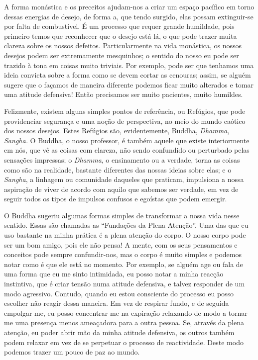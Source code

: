 A forma monástica e os preceitos ajudam-nos a criar um espaço pacífico
em torno dessas energias de desejo, de forma a, que tendo surgido, elas
possam extinguir-se por falta de combustível. É um processo que requer
grande humildade, pois primeiro temos que reconhecer que o desejo está
lá, o que pode trazer muita clareza sobre os nossos defeitos.
Particularmente na vida monástica, os nossos desejos podem ser
extremamente mesquinhos; o sentido do nosso eu pode ser trazido à tona
em coisas muito triviais. Por exemplo, pode ser que tenhamos uma ideia
convicta sobre a forma como se devem cortar as cenouras; assim, se
alguém sugere que o façamos de maneira diferente podemos ficar muito
alterados e tomar uma atitude defensiva! Então precisamos ser muito
pacientes, muito humildes.

Felizmente, existem alguns simples pontos de referência, ou Refúgios,
que pode providenciar segurança e uma noção de perspectiva, no meio do
mundo caótico dos nossos desejos. Estes Refúgios são, evidentemente,
Buddha, \emph{Dhamma}, \emph{Sangha.} O Buddha, o nosso professor, é
também aquele que existe interiormente em nós, que vê as coisas com
clareza, não sendo confundido ou perturbado pelas sensações impressas; o
\emph{Dhamma}, o ensinamento ou a verdade, torna as coisas como são na
realidade, bastante diferentes das nossas ideias sobre elas; e o
\emph{Sangha}, a linhagem ou comunidade daqueles que praticam,
impulsiona a nossa aspiração de viver de acordo com aquilo que sabemos
ser verdade, em vez de seguir todos os tipos de impulsos confusos e
egoístas que podem emergir.

O Buddha sugeriu algumas formas simples de transformar a nossa vida
nesse sentido. Essas são chamadas as ``Fundações da Plena Atenção''. Uma
das que eu uso bastante na minha prática é a plena atenção do corpo. O
nosso corpo pode ser um bom amigo, pois ele não pensa! A mente, com os
seus pensamentos e conceitos pode sempre confundir-nos, mas o corpo é
muito simples e podemos notar como é que ele está no momento. Por
exemplo, se alguém age ou fala de uma forma que eu me sinto intimidada,
eu posso notar a minha reacção instintiva, que é criar tensão numa
atitude defensiva, e talvez responder de um modo agressivo. Contudo,
quando eu estou consciente do processo eu posso escolher não reagir
dessa maneira. Em vez de respirar fundo, e de seguida empolgar-me, eu
posso concentrar-me na expiração relaxando de modo a tornar-me uma
presença menos ameaçadora para a outra pessoa. Se, através da plena
atenção, eu poder abrir mão da minha atitude defensiva, os outros também
podem relaxar em vez de se perpetuar o processo de reactividade. Deste
modo podemos trazer um pouco de paz ao mundo.


